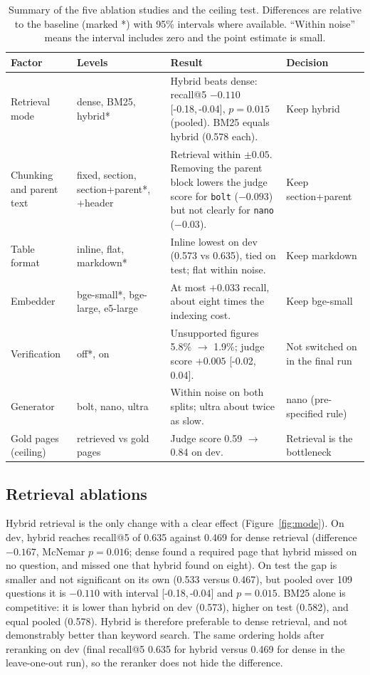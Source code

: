 \documentclass[11pt,a4paper]{article}
\newcommand{\ci}[2]{[#1,\,#2]}
\begin{document}
\begin{table}[t]
\centering
\caption{Summary of the five ablation studies and the ceiling test. Differences are relative to the baseline (marked *) with 95\% intervals where available. ``Within noise'' means the interval includes zero and the point estimate is small.}
\label{tab:summary}
\small
\begin{tabular}{p{2.5cm}p{2.6cm}p{7.0cm}p{2.6cm}}
\toprule
Factor & Levels & Result & Decision \\
\midrule
Retrieval mode & dense, BM25, hybrid* & Hybrid beats dense: recall@5 $-0.110$ \ci{-0.18}{-0.04}, $p=0.015$ (pooled). BM25 equals hybrid (0.578 each). & Keep hybrid \\
Chunking and parent text & fixed, section, section+parent*, +header & Retrieval within $\pm0.05$. Removing the parent block lowers the judge score for \texttt{bolt} ($-0.093$) but not clearly for \texttt{nano} ($-0.03$). & Keep section+parent \\
Table format & inline, flat, markdown* & Inline lowest on dev (0.573 vs 0.635), tied on test; flat within noise. & Keep markdown \\
Embedder & bge-small*, bge-large, e5-large & At most $+0.033$ recall, about eight times the indexing cost. & Keep bge-small \\
Verification & off*, on & Unsupported figures 5.8\% $\to$ 1.9\%; judge score $+0.005$ \ci{-0.02}{0.04}. & Not switched on in the final run \\
Generator & bolt, nano, ultra & Within noise on both splits; ultra about twice as slow. & nano (pre-specified rule) \\
Gold pages (ceiling) & retrieved vs gold pages & Judge score 0.59 $\to$ 0.84 on dev. & Retrieval is the bottleneck \\
\bottomrule
\end{tabular}
\end{table}

\subsection{Retrieval ablations}
Hybrid retrieval is the only change with a clear effect (Figure~\ref{fig:mode}). On dev, hybrid reaches recall@5 of 0.635 against 0.469 for dense retrieval (difference $-0.167$, McNemar $p=0.016$; dense found a required page that hybrid missed on no question, and missed one that hybrid found on eight). On test the gap is smaller and not significant on its own (0.533 versus 0.467), but pooled over 109 questions it is $-0.110$ with interval \ci{-0.18}{-0.04} and $p=0.015$. BM25 alone is competitive: it is lower than hybrid on dev (0.573), higher on test (0.582), and equal pooled (0.578). Hybrid is therefore preferable to dense retrieval, and not demonstrably better than keyword search. The same ordering holds after reranking on dev (final recall@5 0.635 for hybrid versus 0.469 for dense in the leave-one-out run), so the reranker does not hide the difference.
\end{document}
